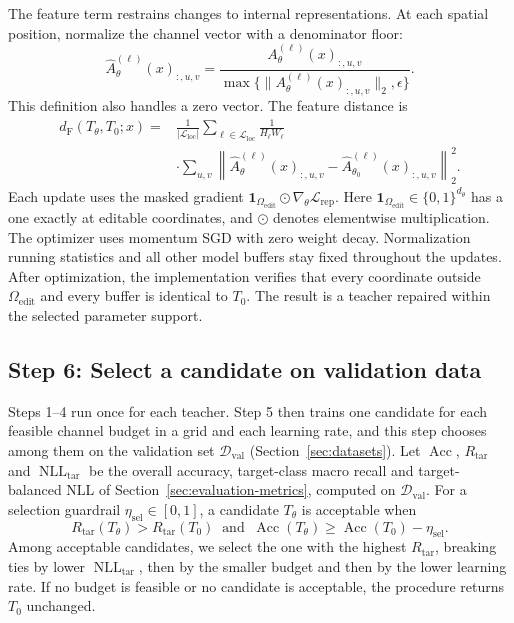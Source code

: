 \documentclass[review,number,sort&compress]{elsarticle}
\theoremstyle{definition}
\begin{document}
The feature term restrains changes to internal
representations. At each spatial position, normalize the
channel vector with a denominator floor:
\begin{equation}
\label{eq:repair-feature-normalization}
\widehat A_\theta^{(\ell)}(x)_{:,u,v}
=
\frac{A_\theta^{(\ell)}(x)_{:,u,v}}
{\max\{\|A_\theta^{(\ell)}(x)_{:,u,v}\|_2,\epsilon\}}.
\end{equation}
This definition also handles a zero vector. The feature
distance is
\begin{equation}
\label{eq:repair-feature-loss}
\begin{aligned}
d_{\mathrm F}(T_\theta,T_0;x)
={}&\frac{1}{|\mathcal L_{\mathrm{loc}}|}
\sum_{\ell\in\mathcal L_{\mathrm{loc}}}
\frac{1}{H_\ell W_\ell}\\
&\cdot\sum_{u,v}
\left\|
\widehat A_\theta^{(\ell)}(x)_{:,u,v}
-\widehat A_{\theta_0}^{(\ell)}(x)_{:,u,v}
\right\|_2^2.
\end{aligned}
\end{equation}
Each update uses the masked gradient
$\mathbf{1}_{\Omega_{\mathrm{edit}}}\odot
\nabla_\theta\mathcal L_{\mathrm{rep}}$.
Here $\mathbf{1}_{\Omega_{\mathrm{edit}}}\in\{0,1\}^{d_\theta}$
has a one exactly at editable coordinates, and $\odot$
denotes elementwise multiplication.
The optimizer uses momentum SGD with zero weight decay.
Normalization running statistics and all other model buffers
stay fixed throughout the updates. After optimization,
the implementation verifies that every coordinate outside
$\Omega_{\mathrm{edit}}$ and every buffer is identical to
$T_0$. The result is a teacher repaired within the selected
parameter support.

\subsection{Step 6: Select a candidate on validation data}
\label{sec:repair-selection}

Steps 1--4 run once for each teacher. Step 5 then trains one candidate
for each feasible channel budget in a grid and each learning rate, and
this step chooses among them on the validation set
$\mathcal D_{\mathrm{val}}$ (Section~\ref{sec:datasets}). Let
$\operatorname{Acc}$, $R_{\mathrm{tar}}$ and
$\operatorname{NLL}_{\mathrm{tar}}$ be the overall accuracy,
target-class macro recall and target-balanced NLL of
Section~\ref{sec:evaluation-metrics}, computed on
$\mathcal D_{\mathrm{val}}$. For a selection guardrail
$\eta_{\mathrm{sel}}\in[0,1]$, a candidate $T_\theta$ is acceptable
when
\begin{equation}
\label{eq:repair-selection}
R_{\mathrm{tar}}(T_\theta)>R_{\mathrm{tar}}(T_0)
\;\;\text{and}\;\;
\operatorname{Acc}(T_\theta)\geq\operatorname{Acc}(T_0)-\eta_{\mathrm{sel}}.
\end{equation}
Among acceptable candidates, we select the one with the highest
$R_{\mathrm{tar}}$, breaking ties by lower
$\operatorname{NLL}_{\mathrm{tar}}$, then by the smaller budget and then
by the lower learning rate. If no budget is feasible or no candidate is
acceptable, the procedure returns $T_0$ unchanged.
\end{document}
